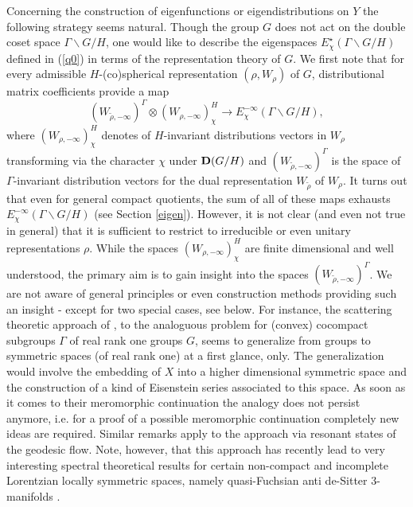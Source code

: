 \documentclass[10]{amsart}
\theoremstyle{remark}
\theoremstyle{definition}
\numberwithin{equation}{section}
\begin{document}
Concerning the construction of eigenfunctions or eigendistributions on $Y$ the following strategy seems natural. Though the group $G$ does not act on the double coset space $\Gamma\backslash G/H$, one would like to describe the eigenspaces $E_\chi^\star(\Gamma\backslash G/H)$ defined in (\ref{q0}) in terms of the representation theory of $G$. We first note that for every admissible $H$-(co)spherical representation $(\rho,W_\rho)$ of $G$, distributional matrix coefficients provide a map 
%
\begin{equation}\label{matcoef}
(W_{\widetilde{\rho},-\infty})^\Gamma\otimes (W_{\rho,-\infty})^{H}_\chi\longrightarrow E_\chi^{-\infty}(\Gamma\backslash G/H),
\end{equation}
% 
where $\displaystyle{(W_{\rho,-\infty})^{H}_\chi}$ denotes of $H$-invariant distributions vectors in $W_\rho$ transforming via the character $\chi$ under ${\bf D}(G/H)$ and 
$\displaystyle{(W_{\widetilde{\rho},-\infty})^\Gamma}$ is the space of $\Gamma$-invariant distribution vectors for the dual representation $W_{\tilde{\rho}}$ of $W_\rho$. 
It turns out that even for general compact quotients, the sum of all of these maps exhausts $E_{\chi}^{-\infty}(\Gamma\backslash G/H)$ (see Section \ref{eigen}). However, it is not clear (and even not true in general) that it is sufficient to restrict to irreducible or even unitary representations $\rho$. While the spaces $(W_{\rho,-\infty})^{H}_\chi$ are finite dimensional and well understood, the primary aim is to gain insight into the spaces $(W_{\widetilde{\rho},-\infty})^\Gamma$. 
We are not aware of general principles or even construction methods providing such an insight - except for two special cases, see below.
For instance, the scattering theoretic approach of \cite{BO00}, to the analoguous problem for (convex) cocompact subgroups $\Gamma$ of real rank one groups $G$, seems
to generalize from groups to symmetric spaces (of real rank one) at a first glance, only. The generalization would involve the embedding of $X$ into a higher dimensional symmetric space and the construction of a kind of Eisenstein series associated to this space. As soon as it comes to their meromorphic continuation the analogy does not persist anymore, i.e.
for a proof of a possible meromorphic continuation completely new ideas are required. Similar remarks apply to the approach \cite{DG16} via resonant states of the geodesic flow. Note, however, that this approach has recently lead to very interesting spectral theoretical results for certain non-compact and incomplete Lorentzian locally symmetric spaces, namely quasi-Fuchsian anti de-Sitter $3$-manifolds \cite{DGM25}.   
\end{document}
